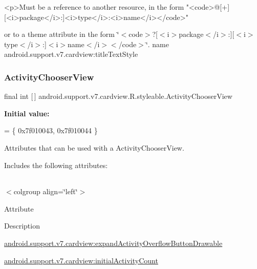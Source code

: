 \begin{DoxyVerb}      <p>Must be a reference to another resource, in the form "<code>@[+][<i>package</i>:]<i>type</i>:<i>name</i></code>"
\end{DoxyVerb}
 or to a theme attribute in the form \char`\"{}$<$code$>$?\mbox{[}$<$i$>$package$<$/i$>$\+:\mbox{]}\mbox{[}$<$i$>$type$<$/i$>$\+:\mbox{]}$<$i$>$name$<$/i$>$$<$/code$>$\char`\"{}.  name android.\+support.\+v7.\+cardview\+:title\+Text\+Style \mbox{\label{classandroid_1_1support_1_1v7_1_1cardview_1_1R_1_1styleable_a97ba41af4dd02474df8be813e34fb7ac}} 
\subsubsection{\texorpdfstring{Activity\+Chooser\+View}{ActivityChooserView}}
{\footnotesize\ttfamily final int \mbox{[}$\,$\mbox{]} android.\+support.\+v7.\+cardview.\+R.\+styleable.\+Activity\+Chooser\+View\hspace{0.3cm}{\ttfamily [static]}}

{\bfseries Initial value\+:}
\begin{DoxyCode}
= \{
            0x7f010043, 0x7f010044
        \}
\end{DoxyCode}
Attributes that can be used with a Activity\+Chooser\+View. 

Includes the following attributes\+:

\tabulinesep=1mm
\begin{longtabu} spread 0pt [c]{*{0}{|X[-1]}|}
\hline
\end{longtabu}
$<$colgroup align=\char`\"{}left\char`\"{}$>$ 

Attribute

Description 

{\ttfamily \hyperlink{classandroid_1_1support_1_1v7_1_1cardview_1_1R_1_1styleable_ae76866cabdcba66de1df2213070ad829}{android.\+support.\+v7.\+cardview\+:expand\+Activity\+Overflow\+Button\+Drawable}}

{\ttfamily \hyperlink{classandroid_1_1support_1_1v7_1_1cardview_1_1R_1_1styleable_a3cf4fe79fcc5864408ce4243825dbbb8}{android.\+support.\+v7.\+cardview\+:initial\+Activity\+Count}}


